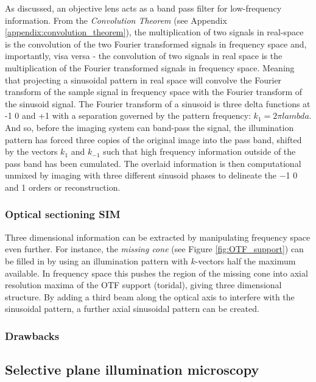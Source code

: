 As discussed, an objective lens acts as a band pass filter for low-frequency information.
From the \emph{Convolution Theorem} (see Appendix \ref{appendix:convolution_theorem}), the multiplication of two signals in real-space is the convolution of the two Fourier transformed signals in frequency space and, importantly, visa versa -
the convolution of two signals in real space is the multiplication of the Fourier transformed signals in frequency space.
Meaning that projecting a sinusoidal pattern in real space will convolve the Fourier transform of the sample signal in frequency space with the Fourier transform of the sinusoid signal.
The Fourier transform of a sinusoid is three delta functions at -1 0 and +1 with a separation governed by the pattern frequency: $k_1 = {2\pi}{lambda}$.
And so, before the imaging system can band-pass the signal, the illumination pattern has forced three copies of the original image into the pass band, shifted by the vectors $k_1$ and $k_{-1}$ such that high frequency information outside of the pass band has been cumulated.
The overlaid information is then computational unmixed by imaging with three different sinusoid phases to delineate the \SI{-1}{} \SI{0}{} and \SI{+1}{} orders or reconstruction.

\subsubsection{Optical sectioning SIM}

Three dimensional information can be extracted by manipulating frequency space even further.
For instance, the \emph{missing cone} (see Figure \ref{fig:OTF_support}) can be filled in by using an illumination pattern with $k$-vectors half the maximum available.
In frequency space this pushes the region of the missing cone into axial resolution maxima of the OTF support (toridal), giving three dimensional structure.
By adding a third beam along the optical axis to interfere with the sinusoidal pattern, a further axial sinusoidal pattern can be created.

\subsubsection{Drawbacks}


\subsection{Selective plane illumination microscopy}

